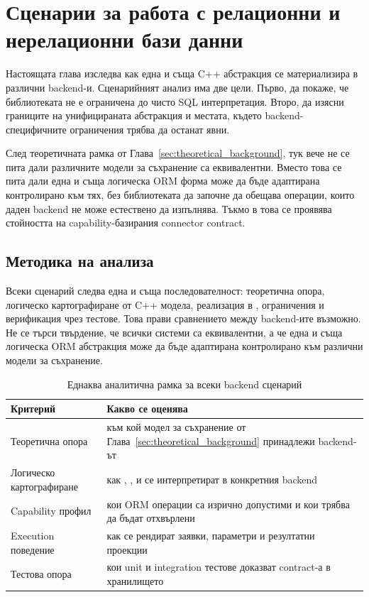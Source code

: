 \section{Сценарии за работа с релационни и нерелационни бази данни}
\label{sec:backend_scenarios}

Настоящата глава изследва как една и съща C++ абстракция се материализира в различни backend-и. Сценарийният анализ има две цели. Първо, да покаже, че библиотеката не е ограничена до чисто SQL интерпретация. Второ, да изясни границите на унифицираната абстракция и местата, където backend-специфичните ограничения трябва да останат явни.

След теоретичната рамка от Глава~\ref{sec:theoretical_background}, тук вече не се пита дали различните модели за съхранение са еквивалентни. Вместо това се пита дали една и съща логическа ORM форма може да бъде адаптирана контролирано към тях, без библиотеката да започне да обещава операции, които даден backend не може естествено да изпълнява. Тъкмо в това се проявява стойността на capability-базирания connector contract.

\subsection{Методика на анализа}

Всеки сценарий следва една и съща последователност: теоретична опора, логическо картографиране от C++ модела, реализация в , ограничения и верификация чрез тестове. Това прави сравнението между backend-ите възможно. Не се търси твърдение, че всички системи са еквивалентни, а че една и съща логическа ORM абстракция може да бъде адаптирана контролирано към различни модели за съхранение.

\begin{table}[H]
\centering
\small
\caption{Еднаква аналитична рамка за всеки backend сценарий}
\label{tab:backend_analysis_frame}
\begin{tabularx}{\textwidth}{L{3.3cm}Y}
\toprule
\textbf{Критерий} & \textbf{Какво се оценява} \\
\midrule
Теоретична опора & към кой модел за съхранение от Глава~\ref{sec:theoretical_background} принадлежи backend-ът \\
Логическо картографиране & как , ,  и  се интерпретират в конкретния backend \\
Capability профил & кои ORM операции са изрично допустими и кои трябва да бъдат отхвърлени \\
Execution поведение & как се рендират заявки, параметри и резултатни проекции \\
Тестова опора & кои unit и integration тестове доказват contract-а в хранилището \\
\bottomrule
\end{tabularx}
\end{table}

